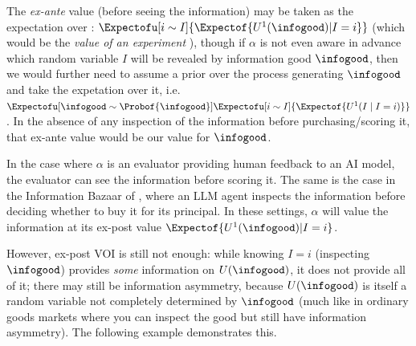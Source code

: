 The \emph{ex-ante} value (before seeing the information) may be taken as the expectation over : $\Expectofu[i\sim I]{\Expectof{U^1(\infogood)|I=i}}$ (which would be the \emph{value of an experiment} ), though if $\alpha$ is not even aware in advance which random variable $I$ will be revealed by information good $\infogood$, then we would further need to assume a prior over the process generating $\infogood$ and take the expetation over it, i.e. $\Expectofu[\infogood\sim \Probof{\infogood}]{\Expectofu[i\sim I]{\Expectof{U^1(I\mid I=i)}}}$. In the absence of any inspection of the information before purchasing/scoring it, that ex-ante value would be our value for $\infogood$.

In the case where $\alpha$ is an evaluator providing human feedback to an AI model, the evaluator can see the information before scoring it. The same is the case in the Information Bazaar of , where an LLM agent inspects the information before deciding whether to buy it for its principal. In these settings, $\alpha$ will value the information at its ex-post value $\Expectof{U^1(\infogood)|I=i}$.



However, ex-post VOI is still not enough: while knowing $I=i$ (inspecting $\infogood$) provides \emph{some} information on $U(\infogood)$, it does not provide all of it; there may still be information asymmetry, because $U(\infogood)$ is itself a random variable not completely determined by $\infogood$ (much like in ordinary goods markets where you can inspect the good but still have information asymmetry). The following example demonstrates this.

